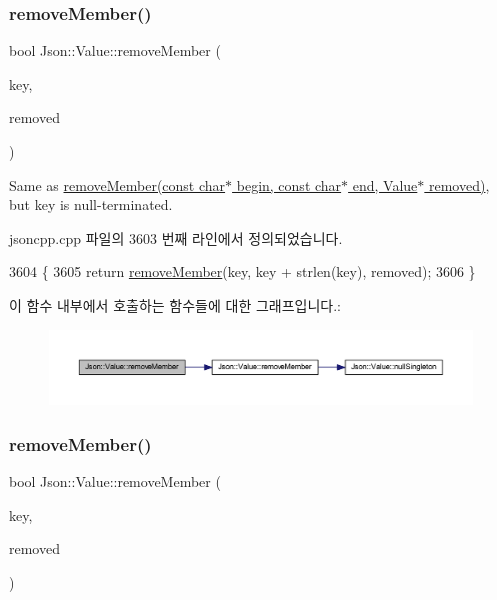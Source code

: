 \subsubsection{\texorpdfstring{remove\+Member()}{removeMember()}\hspace{0.1cm}{\footnotesize\ttfamily [3/5]}}
{\footnotesize\ttfamily bool Json\+::\+Value\+::remove\+Member (\begin{DoxyParamCaption}\item[{const char $\ast$}]{key,  }\item[{\hyperlink{class_json_1_1_value}{Value} $\ast$}]{removed }\end{DoxyParamCaption})}

Same as \hyperlink{class_json_1_1_value_a49c91af727d6b4eb0af02a81bb2def87}{remove\+Member(const char$\ast$ begin, const char$\ast$ end, Value$\ast$ removed)}, but \textquotesingle{}key\textquotesingle{} is null-\/terminated. 

jsoncpp.\+cpp 파일의 3603 번째 라인에서 정의되었습니다.


\begin{DoxyCode}
3604 \{
3605   \textcolor{keywordflow}{return} \hyperlink{class_json_1_1_value_aa52f7873b95d29627d6e83ba96f69aaa}{removeMember}(key, key + strlen(key), removed);
3606 \}
\end{DoxyCode}
이 함수 내부에서 호출하는 함수들에 대한 그래프입니다.\+:\nopagebreak
\begin{figure}[H]
\begin{center}
\leavevmode
\includegraphics[width=350pt]{class_json_1_1_value_a708e599489adf30d65bf85a8ee16e6fb_cgraph}
\end{center}
\end{figure}
\mbox{\label{class_json_1_1_value_ae385ecef98427970df525ee876e9f54a}} 
\subsubsection{\texorpdfstring{remove\+Member()}{removeMember()}\hspace{0.1cm}{\footnotesize\ttfamily [4/5]}}
{\footnotesize\ttfamily bool Json\+::\+Value\+::remove\+Member (\begin{DoxyParamCaption}\item[{\hyperlink{json_8h_a1e723f95759de062585bc4a8fd3fa4be}{J\+S\+O\+N\+C\+P\+P\+\_\+\+S\+T\+R\+I\+NG} const \&}]{key,  }\item[{\hyperlink{class_json_1_1_value}{Value} $\ast$}]{removed }\end{DoxyParamCaption})}




